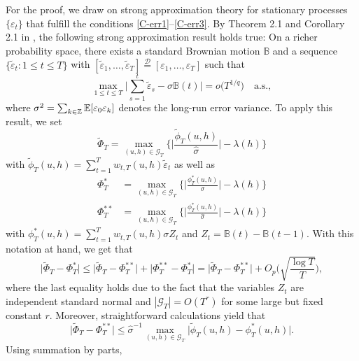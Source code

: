 \documentclass[a4paper,12pt]{article}
\numberwithin{equation}{section}
\begin{document}
For the proof, we draw on strong approximation theory for stationary processes $\{\varepsilon_t\}$ that fulfill the conditions \ref{C-err1}--\ref{C-err3}. By Theorem 2.1 and Corollary 2.1 in \cite{BerkesLiuWu2014}, the following strong approximation result holds true: On a richer probability space, there exists a standard Brownian motion $\mathbb{B}$ and a sequence $\{ \widetilde{\varepsilon}_t: 1 \le t \le T \}$ with $[\widetilde{\varepsilon}_1,\ldots,\widetilde{\varepsilon}_T] \stackrel{\mathcal{D}}{=} [\varepsilon_1,\ldots,\varepsilon_T]$ such that 
\begin{equation}\label{eq-strongapprox-dep}
\max_{1 \le t \le T} \Big| \sum\limits_{s=1}^t \widetilde{\varepsilon}_s - \sigma \mathbb{B}(t) \Big| = o\big( T^{1/q} \big) \quad \text{a.s.},  
\end{equation}
where $\sigma^2 = \sum_{k \in \mathbb{Z}} \mathbb{E}[\varepsilon_0 \varepsilon_k]$ denotes the long-run error variance. To apply this result, we set 
\[ \widetilde{\Phi}_T = \max_{(u,h) \in \mathcal{G}_T} \Big\{ \Big|\frac{\widetilde{\phi}_T(u,h)}{\widehat{\sigma}}\Big| - \lambda(h) \Big\} \]
with $\widetilde{\phi}_T(u,h) = \sum\nolimits_{t=1}^T w_{t,T}(u,h) \widetilde{\varepsilon}_t$ as well as 
\begin{align*}
\Phi_T^* & = \max_{(u,h) \in \mathcal{G}_T} \Big\{ \Big|\frac{\phi_T^*(u,h)}{\sigma}\Big| - \lambda(h) \Big\} \\
\Phi_T^{**} & = \max_{(u,h) \in \mathcal{G}_T} \Big\{ \Big|\frac{\phi_T^*(u,h)}{\widehat{\sigma}}\Big| - \lambda(h) \Big\} 
\end{align*}
with $\phi_T^*(u,h) = \sum\nolimits_{t=1}^T w_{t,T}(u,h) \sigma Z_t$ and $Z_t = \mathbb{B}(t) - \mathbb{B}(t-1)$. With this notation at hand, we get that 
\begin{equation}\label{eq-strongapprox-bound1}
\big| \widetilde{\Phi}_T - \Phi_T^* \big| \le \big| \widetilde{\Phi}_T - \Phi_T^{**} \big| + \big| \Phi_T^{**} - \Phi_T^{*} \big| = \big| \widetilde{\Phi}_T - \Phi_T^{**} \big| + O_p \Big( \sqrt{\frac{\log T}{T}} \Big), 
\end{equation}
where the last equality holds due to the fact that the variables $Z_t$ are independent standard normal and $|\mathcal{G}_T| = O(T^r)$ for some large but fixed constant $r$. Moreover, straightforward calculations yield that 
\[ \big| \widetilde{\Phi}_T - \Phi_T^{**} \big| \le \widehat{\sigma}^{-1} \max_{(u,h) \in \mathcal{G}_T} \big| \widetilde{\phi}_T(u,h) - \phi_T^*(u,h) \big|. \]
Using summation by parts,
\end{document}
